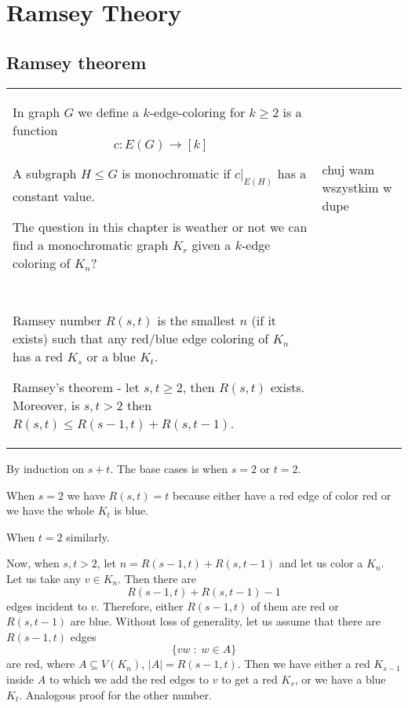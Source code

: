 \section{Ramsey Theory}

\subsection{Ramsey theorem}

\begin{tabularx}{\textwidth}{ X!{\color{git90gray}\vrule} X}

    In graph $G$ we define a {\color{def}$k$-edge-coloring} for $k\geq2$ is a function
    $$c:E(G)\to[k]$$

    A subgraph $H\leq G$ is {\color{def}monochromatic} if $c|_{E(H)}$ has a constant value.
    \medskip

    The question in this chapter is weather or not we can find a monochromatic graph $K_r$ given a $k$-edge coloring of $K_n$?
    
    &

    chuj wam wszystkim w dupe

    \\

    & \\

    \hline 

    & \\

    {\color{def}Ramsey number} $R(s, t)$ is the smallest $n$ (if it exists) such that any red/blue edge coloring of $K_n$ has a red $K_s$ or a blue $K_t$.
    \medskip

    {\color{def}Ramsey's theorem} - let $s,t\geq2$, then $R(s, t)$ exists. Moreover, is $s,t>2$ then $R(s,t)\leq R(s-1, t)+R(s, t-1)$.

\end{tabularx}

\medskip

\medskip

By induction on $s+t$. The base cases is when $s=2$ or $t=2$.

When $s=2$ we have $R(s, t)=t$ because either have a red edge of color red or we have the whole $K_t$ is blue.

When $t=2$ similarly.
\medskip

Now, when $s,t>2$, let $n=R(s-1, t) + R(s, t-1)$ and let us color a $K_n$. Let us take any $v\in K_n$. Then there are 
$$R(s-1, t)+R(s, t-1)-1$$
edges incident to $v$. Therefore, either $R(s-1, t)$ of them are red or $R(s, t-1)$ are blue. Without loss of generality, let us assume that there are $R(s-1, t)$ edges
$$\{vw\;:\;w\in A\}$$
are red, where $A\subseteq V(K_n)$, $|A|=R(s-1, t)$. Then we have either a red $K_{s-1}$ inside $A$ to which we add the red edges to $v$ to get a red $K_s$, or we have a blue $K_t$. Analogous proof for the other number.
\medskip

